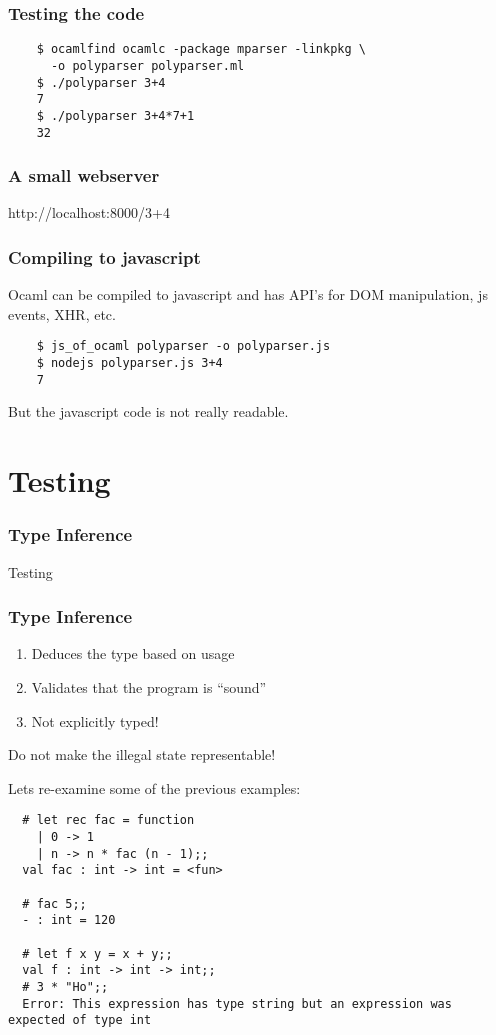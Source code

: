 \documentclass[xcolor=svgnames]{beamer}
\renewcommand{\_}{\mathunderscore}
\begin{document}
\begin{frame}[fragile]
  \frametitle{Testing the code}
  \begin{lstlisting}
    $ ocamlfind ocamlc -package mparser -linkpkg \
      -o polyparser polyparser.ml
    $ ./polyparser 3+4
    7
    $ ./polyparser 3+4*7+1
    32
  \end{lstlisting}
\end{frame}

\begin{frame}[fragile]
  \frametitle{A small webserver}
  
  http://localhost:8000/3+4
\end{frame}

\begin{frame}[fragile]
  \frametitle{Compiling to javascript}
  Ocaml can be compiled to javascript and has API's for DOM
  manipulation, js events, XHR, etc.

  \begin{lstlisting}
    $ js_of_ocaml polyparser -o polyparser.js
    $ nodejs polyparser.js 3+4
    7
  \end{lstlisting}
  \pause
  But the javascript code is not really readable.
\end{frame}

\section{Testing}
\begin{frame}[fragile]
  \frametitle{Type Inference}
  \begin{center}
    \Huge Testing
  \end{center}
\end{frame}

\begin{frame}[fragile]
  \frametitle{Type Inference}
  \begin{enumerate}
  \item Deduces the type based on usage
  \item Validates that the program is ``sound''
  \item Not explicitly typed!
  \end{enumerate}
  \pause
  \begin{center}
    Do not make the illegal state representable!
  \end{center}
\end{frame}


\begin{frame}[fragile]
  Lets re-examine some of the previous examples:
  \begin{lstlisting}
  # let rec fac = function
    | 0 -> 1
    | n -> n * fac (n - 1);;
  val fac : int -> int = <fun>

  # fac 5;;
  - : int = 120

  # let f x y = x + y;;
  val f : int -> int -> int;;
  # 3 * "Ho";;
  Error: This expression has type string but an expression was expected of type int
  \end{lstlisting}

\end{frame}
\end{document}
